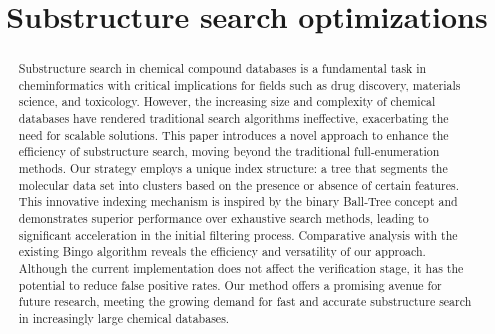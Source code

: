\documentclass{article}
\title{Substructure search optimizations}
\begin{document}
\maketitle

\begin{abstract}
Substructure search in chemical compound databases is a fundamental task in cheminformatics with critical implications for fields such as drug discovery, materials science, and toxicology. However, the increasing size and complexity of chemical databases have rendered traditional search algorithms ineffective, exacerbating the need for scalable solutions. This paper introduces a novel approach to enhance the efficiency of substructure search, moving beyond the traditional full-enumeration methods. Our strategy employs a unique index structure: a tree that segments the molecular data set into clusters based on the presence or absence of certain features. This innovative indexing mechanism is inspired by the binary Ball-Tree concept and demonstrates superior performance over exhaustive search methods, leading to significant acceleration in the initial filtering process. Comparative analysis with the existing Bingo algorithm reveals the efficiency and versatility of our approach. Although the current implementation does not affect the verification stage, it has the potential to reduce false positive rates. Our method offers a promising avenue for future research, meeting the growing demand for fast and accurate substructure search in increasingly large chemical databases.
\end{abstract}

%





%


\end{document}
